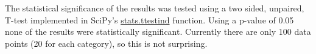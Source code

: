 The statistical significance of the results was tested using a two sided, unpaired, T-test implemented
in {SciPy}'s\cite{2020SciPy-NMeth} \href{https://docs.scipy.org/doc/scipy/reference/generated/scipy.stats.ttest_ind.html}{stats.ttest{\textunderscore}ind} function.
Using a p-value of 0.05 none of the results were statistically significant. 
Currently there are only 100 data points (20 for each category), so this is not 
surprising. 


